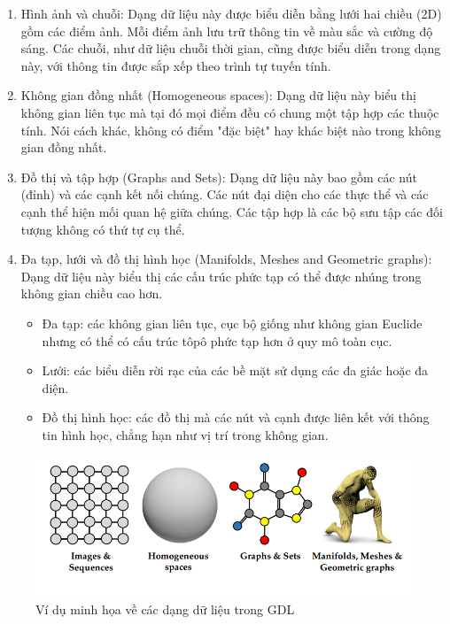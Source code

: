 \begin{enumerate}
    \item Hình ảnh và chuỗi: Dạng dữ liệu này được biểu diễn bằng lưới hai chiều (2D) gồm các điểm ảnh. Mỗi điểm ảnh lưu trữ thông tin về màu sắc và cường độ sáng. Các chuỗi, như dữ liệu chuỗi thời gian, cũng được biểu diễn trong dạng này, với thông tin được sắp xếp theo trình tự tuyến tính.

    \item Không gian đồng nhất (Homogeneous spaces): Dạng dữ liệu này biểu thị không gian liên tục mà tại đó mọi điểm đều có chung một tập hợp các thuộc tính. Nói cách khác, không có điểm "đặc biệt" hay khác biệt nào trong không gian đồng nhất.


    \item Đồ thị và tập hợp (Graphs and Sets): Dạng dữ liệu này bao gồm các nút (đỉnh) và các cạnh kết nối chúng. Các nút đại diện cho các thực thể và các cạnh thể hiện mối quan hệ giữa chúng. Các tập hợp là các bộ sưu tập các đối tượng không có thứ tự cụ thể.


    \item Đa tạp, lưới và đồ thị hình học (Manifolds, Meshes and Geometric graphs): Dạng dữ liệu này biểu thị các cấu trúc phức tạp có thể được nhúng trong không gian chiều cao hơn.
    \begin{itemize}
        \item Đa tạp: các không gian liên tục, cục bộ giống như không gian Euclide nhưng có thể có cấu trúc tôpô phức tạp hơn ở quy mô toàn cục.

        \item Lưới: các biểu diễn rời rạc của các bề mặt sử dụng các đa giác hoặc đa diện.
        
        \item Đồ thị hình học: các đồ thị mà các nút và cạnh được liên kết với thông tin hình học, chẳng hạn như vị trí trong không gian.
\end{itemize}
\end{enumerate}
\begin{figure}[H]
    \centering
    \includegraphics[width=0.7\linewidth]{Images/GDL/gdl_data.png}
    \caption{Ví dụ minh họa về các dạng dữ liệu trong GDL\cite{geometricdeep2022}}
\end{figure}

